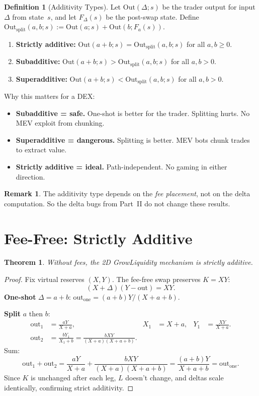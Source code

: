 \documentclass[11pt]{article}
\newtheorem{theorem}{Theorem}
\theoremstyle{definition}
\newtheorem{definition}{Definition}
\newtheorem{remark}{Remark}
\newcommand{\Out}{\mathrm{Out}}
\begin{document}
\begin{definition}[Additivity Types]\label{def:additivity}
Let $\Out(\Delta; s)$ be the trader output for input $\Delta$ from state~$s$,
and let $F_\Delta(s)$ be the post-swap state.
Define $\Out_{\mathrm{split}}(a,b; s) := \Out(a;s) + \Out(b; F_a(s))$.
\begin{enumerate}[label=(\alph*)]
\item \textbf{Strictly additive:} $\Out(a+b;s) = \Out_{\mathrm{split}}(a,b;s)$ for all $a,b\ge 0$.
\item \textbf{Subadditive:} $\Out(a+b;s) > \Out_{\mathrm{split}}(a,b;s)$ for all $a,b > 0$.
\item \textbf{Superadditive:} $\Out(a+b;s) < \Out_{\mathrm{split}}(a,b;s)$ for all $a,b > 0$.
\end{enumerate}
\end{definition}

Why this matters for a DEX:
\begin{itemize}
\item \textbf{Subadditive = safe.}  One-shot is better for the trader.
  Splitting hurts. No MEV exploit from chunking.
\item \textbf{Superadditive = dangerous.}  Splitting is better.
  MEV bots chunk trades to extract value.
\item \textbf{Strictly additive = ideal.}  Path-independent.
  No gaming in either direction.
\end{itemize}

\begin{remark}
The additivity type depends on the \emph{fee placement}, not on the delta
computation.  So the delta bugs from Part~II do not change these results.
\end{remark}


\section{Fee-Free: Strictly Additive}\label{sec:nofee}

\begin{theorem}\label{thm:strict-nofee}
Without fees, the 2D GrowLiquidity mechanism is strictly additive.
\end{theorem}

\begin{proof}
Fix virtual reserves $(X,Y)$.  The fee-free swap preserves $K = XY$:
\[
(X + \Delta)(Y - \mathrm{out}) = XY.
\]
\textbf{One-shot} $\Delta = a+b$:
$\mathrm{out}_{\text{one}} = (a+b)Y / (X+a+b)$.

\textbf{Split} $a$ then $b$:
\begin{align*}
\mathrm{out}_1 &= \frac{aY}{X+a}, &
X_1 &= X+a, & Y_1 &= \frac{XY}{X+a}.\\
\mathrm{out}_2 &= \frac{bY_1}{X_1+b} = \frac{bXY}{(X+a)(X+a+b)}.
\end{align*}
Sum:
\[
\mathrm{out}_1 + \mathrm{out}_2
= \frac{aY}{X+a} + \frac{bXY}{(X+a)(X+a+b)}
= \frac{(a+b)Y}{X+a+b}
= \mathrm{out}_{\text{one}}.
\]
Since $K$ is unchanged after each leg, $L$ doesn't change, and deltas scale
identically, confirming strict additivity.
\end{proof}
\end{document}
